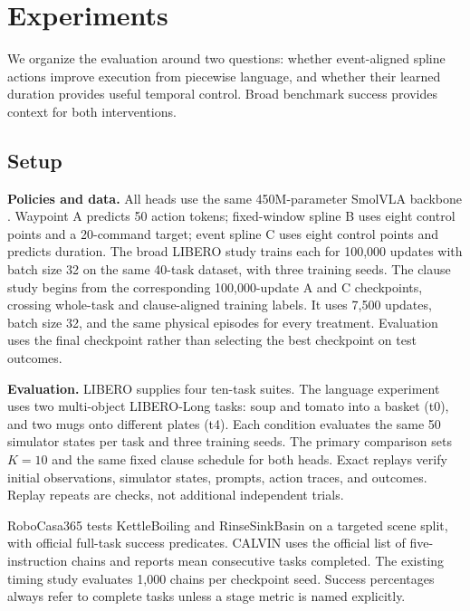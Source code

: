 \section{Experiments}
\label{sec:experiments}

We organize the evaluation around two questions: whether event-aligned spline actions improve execution from piecewise language, and whether their learned duration provides useful temporal control. Broad benchmark success provides context for both interventions.

\subsection{Setup}

\textbf{Policies and data.} All heads use the same 450M-parameter SmolVLA backbone \cite{shukor2025smolvla}. Waypoint A predicts 50 action tokens; fixed-window spline B uses eight control points and a 20-command target; event spline C uses eight control points and predicts duration. The broad LIBERO study trains each for 100,000 updates with batch size 32 on the same 40-task dataset, with three training seeds. The clause study begins from the corresponding 100,000-update A and C checkpoints, crossing whole-task and clause-aligned training labels. It uses 7,500 updates, batch size 32, and the same physical episodes for every treatment. Evaluation uses the final checkpoint rather than selecting the best checkpoint on test outcomes.

\textbf{Evaluation.} LIBERO \cite{liu2023libero} supplies four ten-task suites. The language experiment uses two multi-object LIBERO-Long tasks: soup and tomato into a basket (t0), and two mugs onto different plates (t4). Each condition evaluates the same 50 simulator states per task and three training seeds. The primary comparison sets $K=10$ and the same fixed clause schedule for both heads. Exact replays verify initial observations, simulator states, prompts, action traces, and outcomes. Replay repeats are checks, not additional independent trials.

RoboCasa365 \cite{nasiriany2026robocasa365} tests KettleBoiling and RinseSinkBasin on a targeted scene split, with official full-task success predicates. CALVIN \cite{mees2022calvin} uses the official list of five-instruction chains and reports mean consecutive tasks completed. The existing timing study evaluates 1,000 chains per checkpoint seed. Success percentages always refer to complete tasks unless a stage metric is named explicitly.

